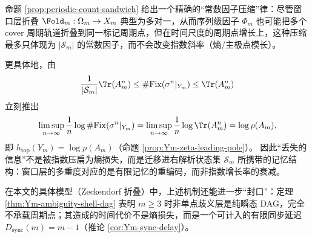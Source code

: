 \begin{remark}[机制：窗口层多对一不等于时间层熵损失]\label{rem:Ym-no-entropy-loss-mechanism}
命题 \ref{prop:periodic-count-sandwich} 给出一个精确的“常数因子压缩”律：尽管窗口层折叠 \(\Fold_m:\Omega_m\to X_m\) 典型为多对一，从而序列级因子 \(\Phi_m\) 也可能把多个 cover 周期轨道折叠到同一标记周期点，但在时间尺度的周期点增长上，这种压缩最多只体现为 \(|\mathcal{S}_m|\) 的常数因子，而不会改变指数斜率（熵/主极点模长）。

更具体地，由
\[
\frac{1}{|\mathcal{S}_m|}\Tr(A_m^n)\le \#\mathrm{Fix}(\sigma^n|_{Y_m})\le \Tr(A_m^n)
\]
立刻推出
\[
\limsup_{n\to\infty}\frac{1}{n}\log\#\mathrm{Fix}(\sigma^n|_{Y_m})
=\limsup_{n\to\infty}\frac{1}{n}\log\Tr(A_m^n)
=\log\rho(A_m),
\]
即 \(h_{\mathrm{top}}(Y_m)=\log\rho(A_m)\)（命题 \ref{prop:Ym-zeta-leading-pole}）。
因此“丢失的信息”不是被指数压扁为熵损失，而是迁移进右解析状态集 \(\mathcal{S}_m\) 所携带的记忆结构：窗口层的多重度对应的是有限记忆的重编码，而非指数增长率的衰减。

在本文的具体模型（Zeckendorf 折叠）中，上述机制还能进一步“封口”：定理 \ref{thm:Ym-ambiguity-shell-dag} 表明 $m\ge 3$ 时非单点歧义层是纯瞬态 DAG，完全不承载周期点；其造成的时间代价不是熵损失，而是一个可计入的有限同步延迟 \(D_{\mathrm{sync}}(m)=m-1\)（推论 \ref{cor:Ym-sync-delay}）。
\end{remark}

